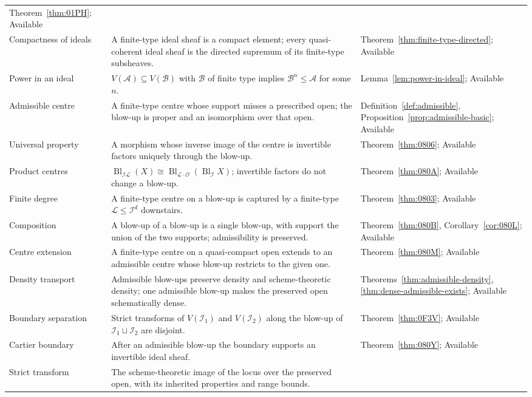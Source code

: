 \documentclass[11pt,a4paper]{article}
\theoremstyle{plain}
\theoremstyle{definition}
\theoremstyle{remark}
\newcommand{\Bl}{\operatorname{Bl}}
\newcommand{\sO}{\mathcal{O}}
\newcommand{\sI}{\mathcal{I}}
\newcommand{\sL}{\mathcal{L}}
\begin{document}
{\begin{longtable}{@{}L{3.05cm}L{8.75cm}L{3.35cm}@{}}
Theorem~\ref{thm:01PH}; Available\\
Compactness of ideals &
A finite-type ideal sheaf is a compact element; every quasi-coherent ideal sheaf is the directed supremum of its finite-type subsheaves. &
Theorem~\ref{thm:finite-type-directed}; Available\\
Power in an ideal &
$V(\mathcal A)\subseteq V(\mathcal B)$ with $\mathcal B$ of finite type implies $\mathcal B^{n}\le\mathcal A$ for some $n$. &
Lemma~\ref{lem:power-in-ideal}; Available\\
Admissible centre &
A finite-type centre whose support misses a prescribed open; the blow-up is proper and an isomorphism over that open. &
Definition~\ref{def:admissible}, Proposition~\ref{prop:admissible-basic}; Available\\
Universal property &
A morphism whose inverse image of the centre is invertible factors uniquely through the blow-up. &
Theorem~\ref{thm:0806}; Available\\
Product centres &
$\Bl_{\sI\sL}(X)\cong\Bl_{\sL\cdot\sO}(\Bl_\sI X)$; invertible factors do not change a blow-up. &
Theorem~\ref{thm:080A}; Available\\
Finite degree &
A finite-type centre on a blow-up is captured by a finite-type $\sL\le\sI^{d}$ downstairs. &
Theorem~\ref{thm:0803}; Available\\
Composition &
A blow-up of a blow-up is a single blow-up, with support the union of the two supports; admissibility is preserved. &
Theorem~\ref{thm:080B}, Corollary~\ref{cor:080L}; Available\\
Centre extension &
A finite-type centre on a quasi-compact open extends to an admissible centre whose blow-up restricts to the given one. &
Theorem~\ref{thm:080M}; Available\\
Density transport &
Admissible blow-ups preserve density and scheme-theoretic density; one admissible blow-up makes the preserved open schematically dense. &
Theorems~\ref{thm:admissible-density}, \ref{thm:dense-admissible-exists}; Available\\
Boundary separation &
Strict transforms of $V(\sI_1)$ and $V(\sI_2)$ along the blow-up of $\sI_1\sqcup\sI_2$ are disjoint. &
Theorem~\ref{thm:0F3V}; Available\\
Cartier boundary &
After an admissible blow-up the boundary supports an invertible ideal sheaf. &
Theorem~\ref{thm:080Y}; Available\\
Strict transform &
The scheme-theoretic image of the locus over the preserved open, with its inherited properties and range bounds. &

\end{longtable}}
\end{document}
